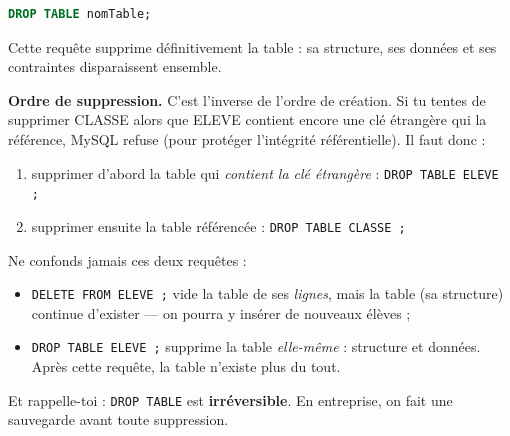 \documentclass[11pt]{article}
\begin{document}
\begin{propriete}
\begin{lstlisting}[language=SQL]
DROP TABLE nomTable;
\end{lstlisting}
Cette requête supprime définitivement la table : sa structure, ses données et ses contraintes disparaissent ensemble.
\end{propriete}

\textbf{Ordre de suppression.} C'est l'inverse de l'ordre de création. Si tu tentes de supprimer CLASSE alors que ELEVE contient encore une clé étrangère qui la référence, MySQL refuse (pour protéger l'intégrité référentielle). Il faut donc :

\begin{enumerate}
\item supprimer d'abord la table qui \emph{contient la clé étrangère} : \texttt{DROP TABLE ELEVE ;}
\item supprimer ensuite la table référencée : \texttt{DROP TABLE CLASSE ;}
\end{enumerate}

\begin{attention}
Ne confonds jamais ces deux requêtes :
\begin{itemize}
\item \texttt{DELETE FROM ELEVE ;} vide la table de ses \emph{lignes}, mais la table (sa structure) continue d'exister — on pourra y insérer de nouveaux élèves ;
\item \texttt{DROP TABLE ELEVE ;} supprime la table \emph{elle-même} : structure et données. Après cette requête, la table n'existe plus du tout.
\end{itemize}
Et rappelle-toi : \texttt{DROP TABLE} est \textbf{irréversible}. En entreprise, on fait une sauvegarde avant toute suppression.
\end{attention}
\end{document}
